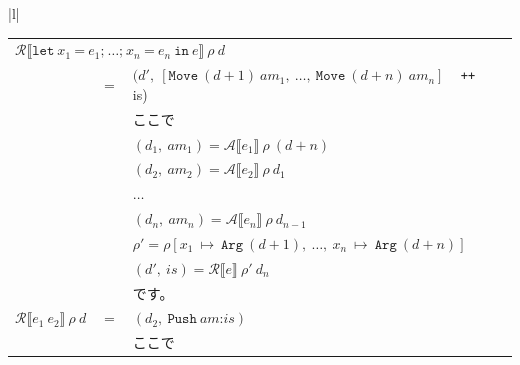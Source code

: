 \documentclass{jbook}
\begin{document}
\begin{tabular} {|l|}
\begin{tabular}{r c l}
		\multicolumn{3}{l}{$\mathcal{R} \llbracket \texttt{let} ~ x_1 ~ \texttt{=} ~ e_1\texttt{;} ~  \ldots \texttt{;} ~ x_n ~ \texttt{=} ~ e_n ~ \texttt{in} ~ e \rrbracket ~ \rho ~ d$}       \\
		                                                         & $=$ & $(d', ~ \left[ \texttt{Move} ~ (d + 1) ~ am_1, ~ \ldots, ~ \texttt{Move} ~ (d + n) ~ am_n \right]$ ~ \texttt{++} ~ is)  \\
		                                                         &     & ここで                                                                                                                  \\
		                                                         &     & $(d_1, ~ am_1) = \mathcal{A} \llbracket e_1 \rrbracket ~ \rho ~ (d + n)$                                                \\
		                                                         &     & $(d_2, ~ am_2) = \mathcal{A} \llbracket e_2 \rrbracket ~ \rho ~ d_1$                                                    \\
		                                                         &     & $\ldots$                                                                                                                \\
		                                                         &     & $(d_n, ~ am_n) = \mathcal{A} \llbracket e_n \rrbracket ~ \rho ~ d_{n - 1}$                                              \\
		                                                         &     & $\rho' = \rho \left[x_1 ~ \mapsto ~ \texttt{Arg} ~ (d + 1), ~ \ldots , ~ x_n ~ \mapsto ~ \texttt{Arg} ~ (d + n)\right]$ \\
		                                                         &     & $(d', ~ is) = \mathcal{R} \llbracket e \rrbracket ~ \rho' ~ d_n$                                                        \\
		                                                         &     & です。                                                                                                                  \\
		$\mathcal{R} \llbracket e_1 ~ e_2 \rrbracket ~ \rho ~ d$ & $=$ & $(d_2, ~ \texttt{Push} ~ am \texttt{:} is)$                                                                             \\
		                                                         &     & ここで                                                                                                                  \\

\end{tabular}
\end{tabular}
\end{document}
